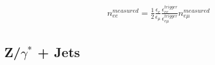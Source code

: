 \begin{gather}
n_{ee}^{measured} = \frac{1}{2}\frac{\epsilon_e}{\epsilon_{\mu}}\frac{\epsilon_{ee}^{trigger}}{\epsilon_{e\mu}^{trigger}}n_{e\mu}^{measured}
\end{gather}

\subsection*{Z/$\gamma^*$ + Jets}




